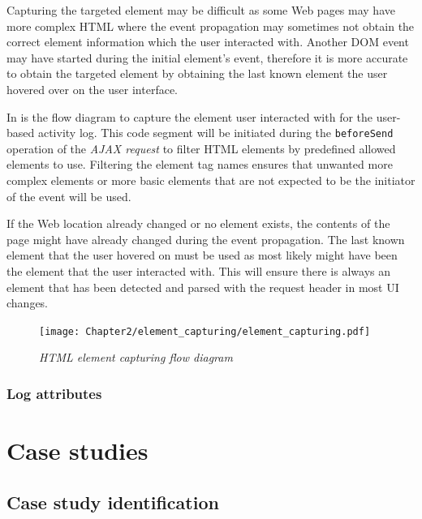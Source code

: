 Capturing the targeted element may be difficult as some Web pages may have more complex HTML where the event propagation may sometimes not obtain the correct element information which the user interacted with. Another DOM event may have started during the initial element's event, therefore it is more accurate to obtain the targeted element by obtaining the last known element the user hovered over on the user interface.\par In  is the flow diagram to capture the element user interacted with for the user-based activity log. This code segment will be initiated during the \texttt{beforeSend} operation of the \textit{AJAX request} to filter HTML elements by predefined allowed elements to use. Filtering the element tag names ensures that unwanted more complex elements or more basic elements that are not expected to be the initiator of the event will be used. \par If the Web location already changed or no element exists, the contents of the page might have already changed during the event propagation. The last known element that the user hovered on must be used as most likely might have been the element that the user interacted with. This will ensure there is always an element that has been detected and parsed with the request header in most UI changes.

\clearpage

\begin{figure}[!htb] %
	\centering %
	\texttt{[image: Chapter2/element\_capturing/element\_capturing.pdf]}
	\caption[HTML element capturing flow diagram]
	{\textit{HTML element capturing flow diagram}}\label{fig:ch2_element_event_capturing}
\end{figure}

\clearpage

\subsubsection{Log attributes}

\section{Case studies}

\subsection{Case study identification}

